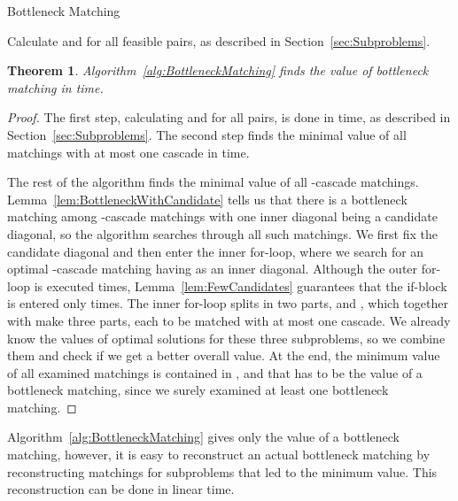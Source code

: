 \documentclass[a4paper, 11pt]{article}
\newtheorem{theorem}{Theorem}
\begin{document}
\begin{algorithm}[h]
	\caption{Bottleneck Matching}
	\label{alg:BottleneckMatching}
	\begin{algorithmic}
		\State Calculate  and  for all feasible  pairs, as described in Section~\ref{sec:Subproblems}.
		
		\State 
		
					\State 
				\EndFor
			\EndIf
		\EndFor
	\end{algorithmic}
\end{algorithm}

\begin{theorem}
	Algorithm~\ref{alg:BottleneckMatching} finds the value of bottleneck matching in  time.
\end{theorem}
\begin{proof}
	The first step, calculating  and  for all  pairs, is done in  time, as described in Section~\ref{sec:Subproblems}. The second step finds the minimal value of all matchings with at most one cascade in  time.

	The rest of the algorithm finds the minimal value of all -cascade matchings. Lemma~\ref{lem:BottleneckWithCandidate} tells us that there is a bottleneck matching among -cascade matchings with one inner diagonal being a candidate diagonal, so the algorithm searches through all such matchings. We first fix the candidate diagonal  and then enter the inner for-loop, where we search for an optimal -cascade matching having  as an inner diagonal. Although the outer for-loop is executed  times, Lemma~\ref{lem:FewCandidates} guarantees that the if-block is entered only  times. The inner for-loop splits  in two parts,  and , which together with  make three parts, each to be matched with at most one cascade. We already know the values of optimal solutions for these three subproblems, so we combine them and check if we get a better overall value. At the end, the minimum value of all examined matchings is contained in , and that has to be the value of a bottleneck matching, since we surely examined at least one bottleneck matching.
\end{proof}

Algorithm~\ref{alg:BottleneckMatching} gives only the value of a bottleneck matching, however, it is easy to reconstruct an actual bottleneck matching by reconstructing matchings for subproblems that led to the minimum value. This reconstruction can be done in linear time.




\end{document}
